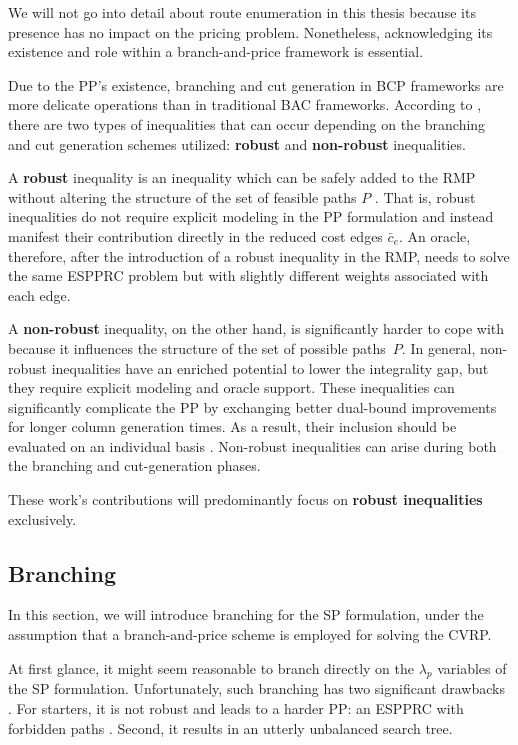 We will not go into detail about route enumeration in this thesis
because its presence has no impact on the pricing problem.
Nonetheless, acknowledging its existence and role within a branch-and-price framework is essential.

\medskip

Due to the PP's existence,
branching and cut generation in BCP frameworks are more delicate operations
than in traditional BAC frameworks.
According to \textcite{dearagao2003},
there are two types of inequalities that can occur
depending on the branching and cut generation schemes utilized:
\textbf{robust} and \textbf{non-robust} inequalities.

A \textbf{robust} inequality is an inequality
which can be safely added to the RMP
without altering the structure of the set of feasible paths $P$ \parencite{fukasawa2006}.
That is,
robust inequalities do not require explicit modeling in the PP formulation
and instead manifest their contribution directly in the reduced cost edges $\bar{c}_e$.
An oracle, therefore,
after the introduction of a robust inequality in the RMP,
needs to solve the same ESPPRC problem
but with slightly different weights associated with each edge.

A \textbf{non-robust} inequality, on the other hand,
is significantly harder to cope with
because it influences the structure of the set of possible paths $P$.
In general,
non-robust inequalities have an enriched potential to lower the integrality gap,
but they require explicit modeling and oracle support.
These inequalities can significantly complicate the PP
by exchanging better dual-bound improvements for longer column generation times.
As a result, their inclusion should be evaluated on an individual basis \parencite{desaulniers2011}.
Non-robust inequalities can arise during both the branching and cut-generation phases.

These work's contributions will predominantly focus
on \textbf{robust inequalities} exclusively.

\subsection{Branching}
\label{sec:bap-branching}

In this section, we will introduce branching for the SP formulation,
under the assumption that a branch-and-price scheme is employed
for solving the CVRP.

At first glance,
it might seem reasonable to branch directly on the $\lambda_p$ variables of the SP formulation.
Unfortunately, such branching has two significant drawbacks \parencite{vanderbeck2010reformulation}.
For starters,
it is not robust and leads to a harder PP: an ESPPRC with forbidden paths \parencite{villeneuve2005}.
Second, it results in an utterly unbalanced search tree.


